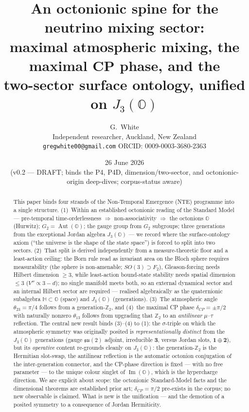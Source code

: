 \documentclass[11pt]{article}
\title{\bfseries An octonionic spine for the neutrino mixing sector:\\
maximal atmospheric mixing, the maximal CP phase, and the\\
two-sector surface ontology, unified on $J_3(\mathbb{O})$}
\author{G.\ White \\
\small Independent researcher, Auckland, New Zealand \\
\small \texttt{gregwhite00@gmail.com} \quad ORCID: 0009-0003-3680-2363}
\date{26 June 2026 \\ \small (v0.2 --- DRAFT; binds the P4, P4D, dimension/two-sector, and octonionic-origin deep-dives; corpus-status aware)}
\theoremstyle{definition}
\newcommand{\OO}{\mathbb{O}}
\newcommand{\HH}{\mathbb{H}}
\newcommand{\Imag}{\operatorname{Im}}
\newcommand{\JthreeO}{J_3(\OO)}
\newcommand{\su}{\mathfrak{su}}
\begin{document}
\maketitle

\begin{abstract}
\noindent
This paper binds four strands of the Non-Temporal Emergence (NTE) programme into a single structure. (1)~Within an established octonionic reading of the Standard Model --- pre-temporal time-orderlessness $\Rightarrow$ non-associativity $\Rightarrow$ the octonions $\OO$ (Hurwitz); $G_2=\operatorname{Aut}(\OO)$; the gauge group from $G_2$ subgroups; three generations from the exceptional Jordan algebra $\JthreeO$ --- we record where the surface-ontology axiom (``the universe is the shape of the state space'') is forced to split into two sectors. (2)~That split is derived independently from a measure-theoretic floor and a least-action ceiling: the Born rule read as invariant area on the Bloch sphere requires measurability (the sphere is non-amenable; $SO(3)\supset F_2$), Gleason-forcing needs Hilbert dimension $\geq 3$, while least-action bound-state stability needs spatial dimension $\leq 3$ ($V''\propto 3-d$); no single manifold meets both, so an external dynamical sector and an internal Hilbert sector are required --- realised algebraically as the quaternionic subalgebra $\HH\subset\OO$ (space) and $\JthreeO$ (generations). (3)~The atmospheric angle $\theta_{23}=\pi/4$ follows from a generation-$\mathbb{Z}_2$, and (4)~the maximal CP phase $\delta_{CP}=\pm\pi/2$ with naturally nonzero $\theta_{13}$ follows from upgrading that $\mathbb{Z}_2$ to an \emph{antilinear} $\mu$--$\tau$ reflection. The central new result binds (3)--(4) to (1): the $\sigma$-triple on which the atmospheric symmetry was originally posited is \emph{representationally distinct} from the $\JthreeO$ generations (gauge $\su(2)$ adjoint, irreducible $\mathbf{3}$, versus Jordan slots, $\mathbf{1}\oplus\mathbf{2}$), but its \emph{operative} content re-grounds cleanly on $\JthreeO$: the generation-$\mathbb{Z}_2$ is the Hermitian slot-swap, the antilinear reflection is the automatic octonion conjugation of the inter-generation connector, and the CP-phase direction is fixed --- with no free parameter --- to the unique colour singlet of $\Imag(\OO)$, which is the hypercharge direction. We are explicit about scope: the octonionic Standard-Model facts and the dimensional theorems are established prior art; $\delta_{CP}=\pi/2$ pre-exists in the corpus; no new observable is claimed. What is new is the unification --- and the demotion of a posited symmetry to a consequence of Jordan Hermiticity.
\end{abstract}
\end{document}
